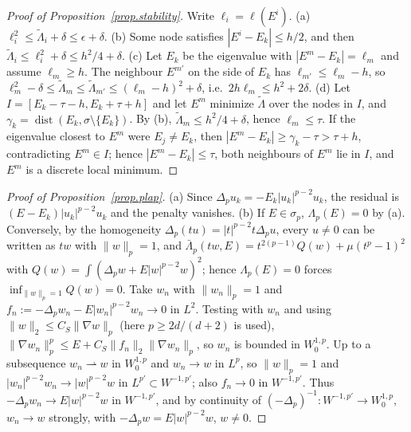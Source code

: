 \documentclass[10pt]{amsart}
\theoremstyle{definition}
\theoremstyle{remark}
\theoremstyle{plain}
\DeclareMathOperator{\dist}{dist}
\begin{document}
\begin{proof}[Proof of Proposition~\ref{prop.stability}]
Write $\ell_i=\ell(E^i)$. (a) $\ell_i^2\le\tilde\Lambda_i+\delta\le\epsilon+\delta$. (b) Some node satisfies
$|E^i-E_k|\le h/2$, and then $\tilde\Lambda_i\le \ell_i^2+\delta\le h^2/4+\delta$. (c) Let $E_k$ be the
eigenvalue with $|E^m-E_k|=\ell_m$ and assume $\ell_m\ge h$. The neighbour $E^{m'}$ on the side of $E_k$ has
$\ell_{m'}\le \ell_m-h$, so $\ell_m^2-\delta\le\tilde\Lambda_m\le\tilde\Lambda_{m'}\le(\ell_m-h)^2+\delta$, i.e.\
$2h\ell_m\le h^2+2\delta$. (d) Let $I=[E_k-\tau-h,E_k+\tau+h]$ and let $E^m$ minimize $\tilde\Lambda$ over
the nodes in $I$, and $\gamma_k=\dist(E_k,\sigma\setminus\{E_k\})$. By (b), $\tilde\Lambda_m\le h^2/4+\delta$, hence $\ell_m\le\tau$. If the eigenvalue closest
to $E^m$ were $E_j\ne E_k$, then $|E^m-E_k|\ge\gamma_k-\tau>\tau+h$, contradicting $E^m\in I$; hence
$|E^m-E_k|\le\tau$, both neighbours of $E^m$ lie in $I$, and $E^m$ is a discrete local minimum.
\end{proof}

\begin{proof}[Proof of Proposition~\ref{prop.plap}]
(a) Since $\Delta_pu_k=-E_k|u_k|^{p-2}u_k$, the residual is $(E-E_k)|u_k|^{p-2}u_k$ and the penalty
vanishes. (b) If $E\in\sigma_p$, $\Lambda_p(E)=0$ by (a). Conversely, by the homogeneity
$\Delta_p(tu)=|t|^{p-2}t\Delta_pu$, every $u\ne0$ can be written as $tw$ with $\|w\|_p=1$, and
$\bar\Lambda_p(tw,E)=t^{2(p-1)}Q(w)+\mu(t^p-1)^2$ with $Q(w)=\int(\Delta_pw+E|w|^{p-2}w)^2$; hence
$\Lambda_p(E)=0$ forces $\inf_{\|w\|_p=1}Q(w)=0$. Take $w_n$ with $\|w_n\|_p=1$ and
$f_n:=-\Delta_pw_n-E|w_n|^{p-2}w_n\to0$ in $L^2$. Testing with $w_n$ and using
$\|w\|_2\le C_S\|\nabla w\|_p$ (here $p\ge2d/(d+2)$ is used),
$\|\nabla w_n\|_p^p\le E+C_S\|f_n\|_2\|\nabla w_n\|_p$, so $w_n$ is bounded in $W^{1,p}_0$. Up to a
subsequence $w_n\rightharpoonup w$ in $W^{1,p}_0$ and $w_n\to w$ in $L^p$, so $\|w\|_p=1$ and
$|w_n|^{p-2}w_n\to|w|^{p-2}w$ in $L^{p'}\subset W^{-1,p'}$; also $f_n\to0$ in $W^{-1,p'}$. Thus
$-\Delta_pw_n\to E|w|^{p-2}w$ in $W^{-1,p'}$, and by continuity of $(-\Delta_p)^{-1}\colon
W^{-1,p'}\to W^{1,p}_0$, $w_n\to w$ strongly, with $-\Delta_pw=E|w|^{p-2}w$, $w\ne0$.
\end{proof}
\end{document}
